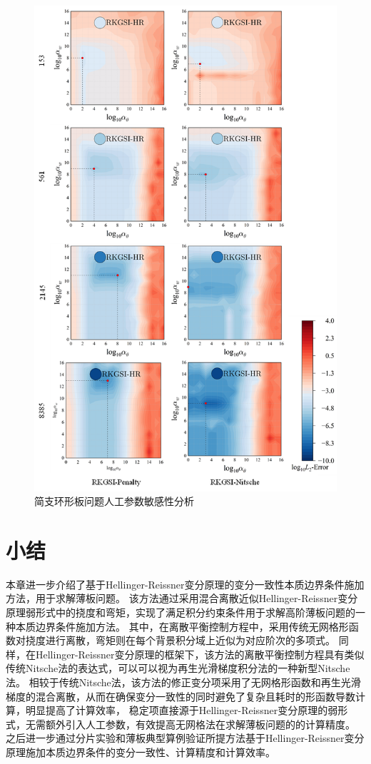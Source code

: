 \begin{figure}[H]
    \centering
    \includegraphics[scale=1.1]{figure/PHR/A/alpha.png}
    \caption{简支环形板问题人工参数敏感性分析}\label{Aalpha}
\end{figure}
\section{小结}
本章进一步介绍了基于Hellinger-Reissner变分原理的变分一致性本质边界条件施加方法，用于求解薄板问题。
该方法通过采用混合离散近似Hellinger-Reissner变分原理弱形式中的挠度和弯矩，实现了满足积分约束条件用于求解高阶薄板问题的一种本质边界条件施加方法。
其中，在离散平衡控制方程中，采用传统无网格形函数对挠度进行离散，弯矩则在每个背景积分域上近似为对应阶次的多项式。
同样，在Hellinger-Reissner变分原理的框架下，该方法的离散平衡控制方程具有类似传统Nitsche法的表达式，可以可以视为再生光滑梯度积分法的一种新型Nitsche法。
相较于传统Nitsche法，该方法的修正变分项采用了无网格形函数和再生光滑梯度的混合离散，从而在确保变分一致性的同时避免了复杂且耗时的形函数导数计算，明显提高了计算效率，
稳定项直接源于Hellinger-Reissner变分原理的弱形式，无需额外引入人工参数，有效提高无网格法在求解薄板问题的的计算精度。
之后进一步通过分片实验和薄板典型算例验证所提方法基于Hellinger-Reissner变分原理施加本质边界条件的变分一致性、计算精度和计算效率。





